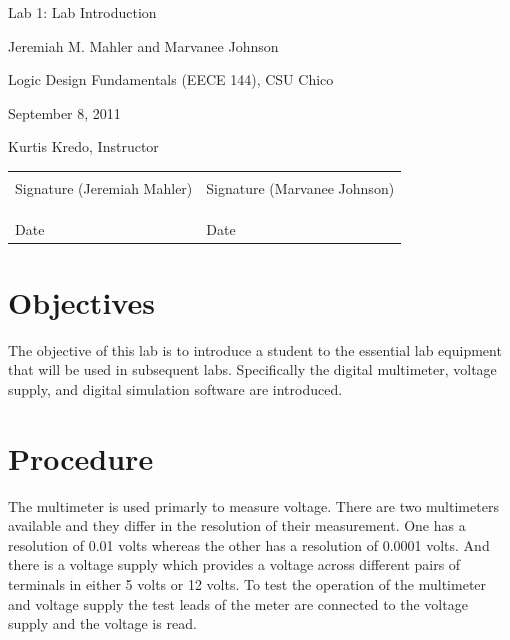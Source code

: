 \documentclass{article}
\begin{document}

\null
\thispagestyle{empty} %
\vfill
\centerline{\LARGE Lab 1: Lab Introduction}
\vspace{0.3in}
\centerline{Jeremiah M. Mahler and Marvanee Johnson}
\centerline{Logic Design Fundamentals (EECE 144), CSU Chico}
\centerline{September 8, 2011}
\centerline{Kurtis Kredo, Instructor}
\vspace{5in}

\begin{center}
\begin{tabular}{l l}
\uline{\hspace{2.5in}} & \uline{\hspace{2.5in}} \\
Signature (Jeremiah Mahler) & Signature (Marvanee Johnson) \\
& \\
& \\
\uline{\hspace{2.5in}} & \uline{\hspace{2.5in}} \\
Date & Date \\
\end{tabular}
\end{center}

\vfill  %
\pagebreak

\thispagestyle{plain}  %

\tableofcontents

\pagebreak

\section{Objectives}

The objective of this lab is to introduce a student to
the essential lab equipment that will be used in subsequent labs.
Specifically the digital multimeter, voltage supply, and digital simulation
software are introduced.

\section{Procedure}

The multimeter is used primarly to measure voltage.
There are two multimeters available and they differ in
the resolution of their measurement.
One has a resolution of 0.01 volts whereas the other has a resolution
of 0.0001 volts.
And there is a voltage supply which provides a voltage across
different pairs of terminals in either 5 volts or 12 volts.
To test the operation of the multimeter and voltage supply the test
leads of the meter are connected to the voltage supply and the voltage
is read.
\end{document}
